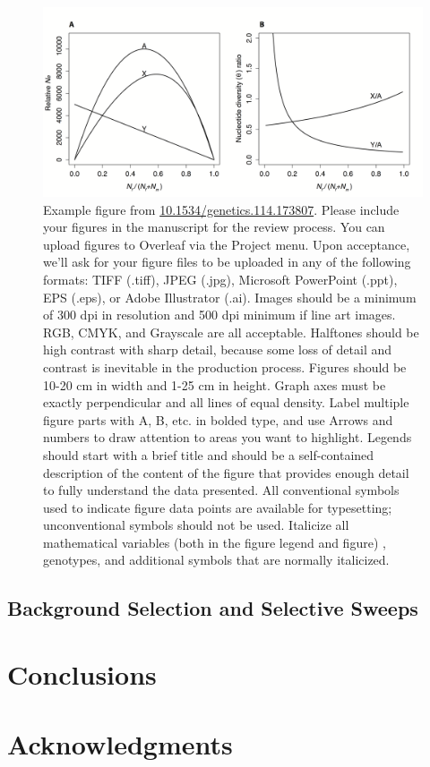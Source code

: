 \documentclass[9pt,twocolumn,twoside]{gsajnl}
\begin{document}
\begin{figure}[htbp]
\centering
\includegraphics[width=\linewidth]{Figure1.png}
\caption{Example figure from \url{10.1534/genetics.114.173807}. Please include your figures in the manuscript for the review process. You can upload figures to Overleaf via the Project menu. Upon acceptance, we'll ask for your figure files to be uploaded in any of the following formats: TIFF (.tiff), JPEG (.jpg), Microsoft PowerPoint (.ppt), EPS (.eps), or Adobe Illustrator (.ai).  Images should be a minimum of 300 dpi in resolution and 500 dpi minimum if line art images.  RGB, CMYK, and Grayscale are all acceptable. Halftones should be high contrast with sharp detail, because some loss of detail and contrast is inevitable in the production process. Figures should be 10-20 cm in width and 1-25 cm in height. Graph axes must be exactly perpendicular and all lines of equal density.
Label multiple figure parts with A, B, etc. in bolded type, and use Arrows and numbers to draw attention to areas you want to highlight. Legends should start with a brief title and should be a self-contained description of the content of the figure that provides enough detail to fully understand the data presented. All conventional symbols used to indicate figure data points are available for typesetting; unconventional symbols should not be used. Italicize all mathematical variables (both in the figure legend and figure) , genotypes, and additional symbols that are normally italicized.  
}%
\label{fig:spectrum}
\end{figure}



\subsection*{Background Selection and Selective Sweeps} 

\section*{Conclusions}
\section*{Acknowledgments}



\end{document}
